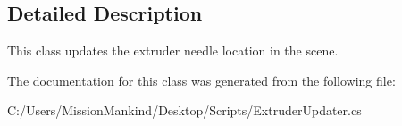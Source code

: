 \subsection{Detailed Description}
This class updates the extruder needle location in the scene. 



The documentation for this class was generated from the following file\+:\begin{DoxyCompactItemize}
\item 
C\+:/\+Users/\+Mission\+Mankind/\+Desktop/\+Scripts/Extruder\+Updater.\+cs\end{DoxyCompactItemize}
